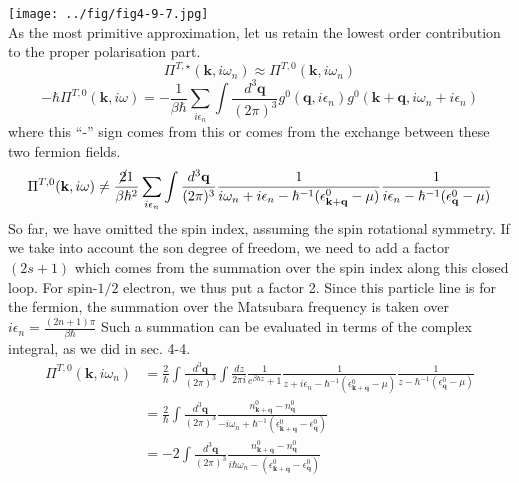 \texttt{[image: ../fig/fig4-9-7.jpg]}\\
As the most primitive approximation, let us retain the lowest order contribution to the proper polarisation part.
\begin{equation}\label{eq4.9.24}
\Pi^{T,\star}(\mathbf k,i\omega_n)\approx \Pi^{T,0}(\mathbf k,i\omega_n)
\end{equation}
\begin{equation}
-\hbar \Pi^{T,0}(\mathbf k,i\omega)=-\frac{1}{\beta\hbar} \sum_{i\epsilon_n} \int \frac{d^3 \mathbf q}{(2\pi)^3} g^0(\mathbf q,i\epsilon_n) g^0(\mathbf k+\mathbf q,i\omega_n+i\epsilon_n)
\end{equation}
where this ``-'' sign comes from this or comes from the exchange between these two fermion fields.
\begin{equation}
\Pi^{T,0}(\mathbf k,i\omega)\not=\frac{\cancel{2}{1}}{\beta\hbar^2} \sum_{i\epsilon_n} \int \frac{d^3\mathbf q}{(2\pi)^3}\frac{1}{i\omega_n+i\epsilon_n-\hbar^{-1}(\epsilon^0_{\mathbf k+\mathbf q}-\mu)} \frac{1}{i\epsilon_n-\hbar^{-1}(\epsilon^0_{\mathbf q}-\mu)}
\end{equation}
 So far, we have omitted the spin index, assuming the spin rotational symmetry.
 If we take into account the son degree of freedom, we need to add a factor $(2s+1)$ which comes from the summation over
the spin index along this closed loop.
 For spin-$1/2$ electron, we thus put a factor 2.
 Since this particle line is for the fermion, the summation over the Matsubara frequency is taken over $i\epsilon_n=\frac{(2n+1)\pi}{\beta\hbar}$
 Such a summation can be evaluated in terms of the complex integral, as we did in sec. 4-4.
\begin{equation}
\begin{aligned}
\Pi^{T,0}(\mathbf k,i\omega_n)&=\frac{2}{\hbar}\int \frac{d^3 \mathbf q}{(2\pi)^3} \int\frac{dz}{2\pi i}\frac{1}{e^{\beta\hbar z}+1} \frac{1}{z+i\epsilon_n-\hbar^{-1}(\epsilon^0_{\mathbf k+\mathbf q}-\mu)} \frac{1}{z-\hbar^{-1}(\epsilon^0_{\mathbf q}-\mu)}\\
&=\frac{2}{\hbar} \int \frac{d^3\mathbf q}{(2\pi)^3} \frac{n^0_{\mathbf k+\mathbf q}-n^0_{\mathbf q}}{-i\omega_n+\hbar^{-1}(\epsilon^0_{\mathbf k+\mathbf q}-\epsilon^0_{\mathbf q})}\\
&=-2\int \frac{d^3\mathbf q}{(2\pi)^3}\frac{n^0_{\mathbf k+\mathbf q}-n^0_{\mathbf q}}{i\hbar\omega_n-(\epsilon^0_{\mathbf k+\mathbf q}-\epsilon^0_{\mathbf q})}
\end{aligned}
\end{equation}
